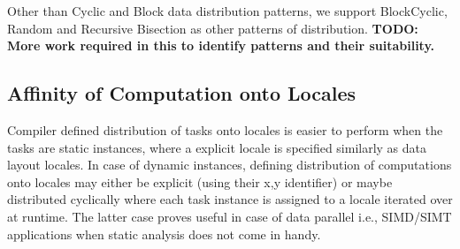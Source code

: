 Other than Cyclic and Block data distribution patterns, we support BlockCyclic, Random and Recursive Bisection as other patterns of distribution. \textbf{TODO: More work required in this to identify patterns and their suitability.}

\subsection{Affinity of Computation onto Locales}
Compiler defined distribution of tasks onto locales is easier to perform when the tasks are static instances, where a explicit locale is specified similarly as data layout locales. In case of dynamic instances, defining distribution of computations onto locales may either be explicit (using their {x,y} identifier) or maybe distributed cyclically where each task instance is assigned to a locale iterated over at runtime. The latter case proves useful in case of data parallel i.e., SIMD/SIMT applications when static analysis does not come in handy.